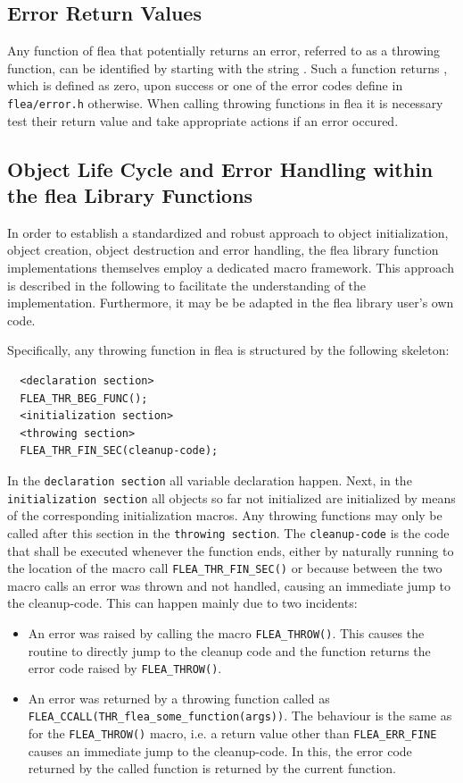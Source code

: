 \documentclass[a4paper,11pt]{scrartcl}
\begin{document}
\subsection{Error Return Values}
\label{secErrRet}
Any function of flea that potentially returns an error, referred to as a throwing function, can be identified by starting with the string
. Such a function returns , which is defined as
zero, upon success or one of the error codes define in \verb#flea/error.h# otherwise.
When calling throwing functions in flea it is necessary test their return value
and take appropriate actions if an error occured.

\subsection{Object Life Cycle and Error Handling within the flea Library Functions}
\label{fleaFuncSkel}
In order to establish a standardized and robust approach to object initialization,
object creation, object destruction and error handling, the flea library
function implementations themselves employ a dedicated macro framework. This
approach is described in the following to facilitate the understanding of the
implementation. Furthermore, it may be be adapted in the flea library user's own
code.

Specifically, any throwing function in flea is structured by the following skeleton:
\begin{verbatim}
  <declaration section>
  FLEA_THR_BEG_FUNC();
  <initialization section>
  <throwing section> 
  FLEA_THR_FIN_SEC(cleanup-code);
\end{verbatim}
In the \verb#declaration section# all variable declaration happen. Next, in the \verb#initialization section#  
all objects so far not initialized are initialized by means of the
corresponding initialization macros. Any throwing functions may only be called
after this section in the \verb#throwing section#. 
The \verb#cleanup-code# is the code that shall be executed whenever the function ends,
either by naturally running to the location of the macro call
\verb#FLEA_THR_FIN_SEC()# or because between the two macro calls an error was
thrown and not handled, causing an immediate jump to the cleanup-code. This can happen mainly due to two incidents:
\begin{itemize}
  \item An error was raised by calling the macro \verb#FLEA_THROW()#. This
    causes the routine to directly jump to the cleanup code and the function
    returns the error code raised by \verb#FLEA_THROW()#. 
  \item An error was returned by a throwing function called as
    \verb#FLEA_CCALL(THR_flea_some_function(args))#. The behaviour is the same
    as for the \verb#FLEA_THROW()# macro, i.e. a return value other than
    \verb#FLEA_ERR_FINE# causes an immediate jump to the cleanup-code. In this, the error code returned by the
    called function is returned by the current function.
\end{itemize}
\end{document}
